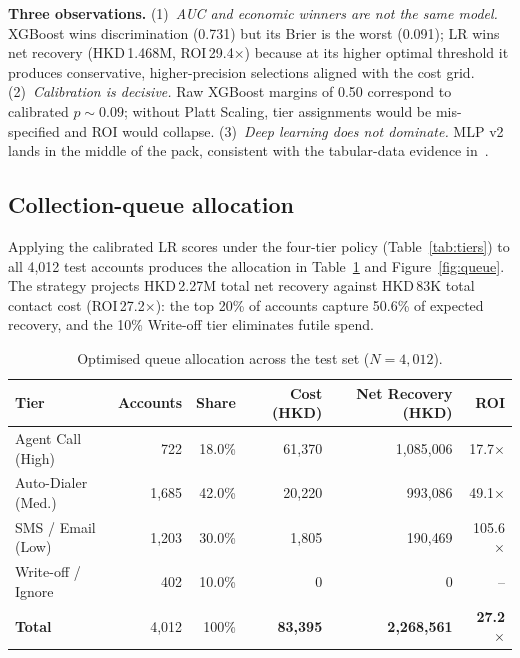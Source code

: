 \documentclass[11pt, a4paper]{article}
\begin{document}
\textbf{Three observations.}
(1)~\textit{AUC and economic winners are not the same model.} XGBoost wins discrimination (0.731) but its Brier is the worst (0.091); LR wins net recovery (HKD\,1.468M, ROI\,29.4$\times$) because at its higher optimal threshold it produces conservative, higher-precision selections aligned with the cost grid.
(2)~\textit{Calibration is decisive.} Raw XGBoost margins of 0.50 correspond to calibrated $p\!\sim\!0.09$; without Platt Scaling, tier assignments would be mis-specified and ROI would collapse.
(3)~\textit{Deep learning does not dominate.} MLP v2 lands in the middle of the pack, consistent with the tabular-data evidence in~\cite{grinsztajn2022}.

\subsection{Collection-queue allocation}

Applying the calibrated LR scores under the four-tier policy (Table~\ref{tab:tiers}) to all 4{,}012 test accounts produces the allocation in Table~\ref{tab:queue} and Figure~\ref{fig:queue}. The strategy projects HKD\,2.27M total net recovery against HKD\,83K total contact cost (ROI\,27.2$\times$): the top 20\% of accounts capture 50.6\% of expected recovery, and the 10\% Write-off tier eliminates futile spend.

\begin{table}[H]
\centering
\caption{Optimised queue allocation across the test set ($N=4{,}012$).}\label{tab:queue}
\small
\setlength{\tabcolsep}{5pt}
\renewcommand{\arraystretch}{1.05}
\begin{tabular}{@{}lrrrrr@{}}
\toprule
\textbf{Tier} & \textbf{Accounts} & \textbf{Share} & \textbf{Cost (HKD)} & \textbf{Net Recovery (HKD)} & \textbf{ROI}\\
\midrule
Agent Call (High)     & 722  & 18.0\% & 61{,}370 & 1{,}085{,}006 & 17.7$\times$\\
Auto-Dialer (Med.)    & 1{,}685 & 42.0\% & 20{,}220 & 993{,}086 & 49.1$\times$\\
SMS / Email (Low)     & 1{,}203 & 30.0\% & 1{,}805 & 190{,}469 & 105.6$\times$\\
Write-off / Ignore    & 402  & 10.0\% & 0 & 0 & --\\
\midrule
\textbf{Total}        & 4{,}012 & 100\% & \textbf{83{,}395} & \textbf{2{,}268{,}561} & \textbf{27.2$\times$}\\
\bottomrule
\end{tabular}
\end{table}
\end{document}
